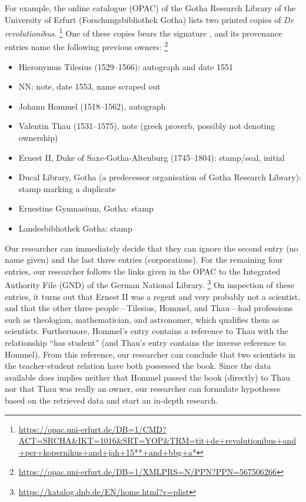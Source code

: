 For example, the online catalogue (OPAC) of the Gotha Research Library of the University of Erfurt (Forschungsbibliothek Gotha) lists two printed copies
of \emph{De revolutionibus}.%
\footnote{%
  \url{https://opac.uni-erfurt.de/DB=1/CMD?ACT=SRCHA&IKT=1016&SRT=YOP&TRM=tit+de+revolutionibus+and+per+kopernikus+and+jah+15**+and+bbg+a*}%
}
One of these copies bears the signature , and its provenance entries name the following previous owners:%
\footnote{%
  \url{https://opac.uni-erfurt.de/DB=1/XMLPRS=N/PPN?PPN=567506266}%
}
%
\begin{itemize}
  \item
    Hieronymus Tilesius (1529–1566): autograph and date 1551
  \item
    NN: note, date 1553, name scraped out
  \item
    Johann Hommel (1518–1562), autograph
  \item
    Valentin Thau (1531–1575), note (greek proverb, possibly not denoting ownership)
  \item
    Ernest II, Duke of Saxe-Gotha-Altenburg (1745–1804): stamp/seal, initial
  \item
    Ducal Library, Gotha (a predecessor organisation of Gotha Research Library): stamp marking a duplicate
  \item
    Ernestine Gymnasium, Gotha: stamp
  \item
    Landesbibliothek Gotha: stamp
\end{itemize}
%
Our researcher can immediately decide that they can ignore the second entry (no name given) and the last three entries (corporations).
For the remaining four entries, our researcher follows the links given in the OPAC to the Integrated Authority File (GND) of the German National Library.%
\footnote{%
  \url{https://katalog.dnb.de/EN/home.html?v=plist}%
}
On inspection of these entries, it turns out that Ernest II was a regent and very probably not a scientist,
and that the other three people---Tilesius, Hommel, and Thau---had professions such as theologian,
mathematician, and astronomer, which qualifies them as scientists. Furthermore, Hommel's entry
contains a reference to Thau with the relationship ``has student''
(and Thau's entry contains the inverse reference to Hommel).
From this reference, our researcher can conclude that two scientists in the teacher-student relation
have both possessed the book. Since the data available does implies neither that Hommel passed the book (directly) to Thau
nor that Thau was really an owner,
our researcher can formulate hypotheses based on the retrieved data and start an in-depth research.

